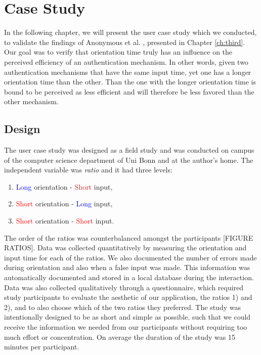 
\chapter{Case Study}\label{ch:fifth}

In the following chapter, we will present the user case study which we conducted, to validate the findings of Anonymous et al. \cite{anonymous}, presented in Chapter \ref{ch:third}. Our goal was to verify that orientation time truly has an influence on the perceived efficiency of an authentication mechanism. In other words, given two authentication mechanisms that have the same input time, yet one has a longer orientation time than the other. Than the one with the longer orientation time is bound to be perceived as less efficient and will therefore be less favored than the other mechanism. 


\section{Design}

The user case study was designed as a field study and was conducted on campus of the computer science department of Uni Bonn and at the author's home. The independent variable was \textit{ratio} and it had three levels:
\begin{enumerate}
    \item \textcolor{blue}{Long} orientation - \textcolor{red}{Short} input, 
    \item \textcolor{red}{Short} orientation - \textcolor{blue}{Long} input,
    \item \textcolor{red}{Short} orientation - \textcolor{red}{Short} input.
\end{enumerate}

The order of the ratios was counterbalanced amongst the participants [FIGURE RATIOS]. Data was collected quantitatively by measuring the orientation and input time for each of the ratios. We also documented the number of errors made during orientation and also when a false input was made. This information was automatically documented and stored in a local database during the interaction. Data was also collected qualitatively through a questionnaire, which required study participants to evaluate the aesthetic of our application, the ratios 1) and 2), and to also choose which of the two ratios they preferred. The study was intentionally designed to be as short and simple as possible. such that we could receive the information we needed from our participants without requiring too much effort or concentration. On average the duration of the study was 15 minutes per participant. 



